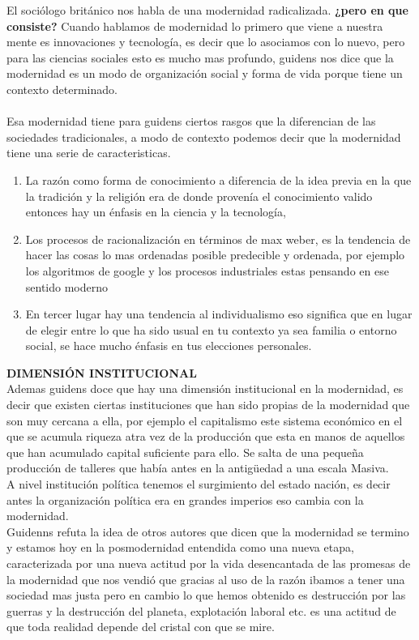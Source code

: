 \documentclass[12pt]{book}
\begin{document}
\newpage 
El sociólogo británico nos habla de una modernidad radicalizada. 
\textbf{¿pero en que consiste?}
Cuando hablamos de modernidad lo primero que viene a nuestra mente es innovaciones y tecnología, es decir que lo asociamos con lo nuevo, pero para las ciencias sociales esto es mucho mas profundo, guidens nos dice que la modernidad es un modo de organización social y forma de vida porque tiene un contexto determinado.
\\
\\
Esa modernidad tiene para guidens ciertos rasgos que la diferencian de las sociedades tradicionales, a modo de contexto podemos decir que la modernidad tiene una serie de caracteristicas.
\begin{enumerate}
\item La razón como forma de conocimiento a diferencia de la idea previa en la que la tradición y la religión era de donde provenía el conocimiento valido entonces hay un énfasis en la ciencia y la tecnología, 
\item Los procesos de racionalización en términos de max weber, es la tendencia de hacer las cosas lo mas ordenadas posible predecible y ordenada, por ejemplo los algoritmos de google y los procesos industriales estas pensando en ese sentido moderno
\item En tercer lugar hay una tendencia al individualismo eso significa que en lugar de elegir entre lo que ha sido usual en tu contexto ya sea familia o entorno social, se hace mucho énfasis en tus elecciones personales.

\end{enumerate}
\textbf{DIMENSIÓN INSTITUCIONAL}
\\
Ademas guidens doce que hay una dimensión institucional en la modernidad, es decir que existen ciertas instituciones que han sido propias de la modernidad que son muy cercana a ella, por ejemplo el capitalismo este sistema económico en el que se acumula riqueza atra vez de la producción que esta en manos de aquellos que han acumulado capital suficiente para ello.
Se salta de una pequeña producción de talleres que había antes en la antigüedad a una escala Masiva.
\\
A nivel institución política tenemos el surgimiento del estado nación, es decir antes la organización política era en grandes imperios eso cambia con la modernidad.
\\
Guidenns refuta la idea de otros autores que dicen que la modernidad se termino y estamos hoy en la posmodernidad entendida como una nueva etapa, caracterizada por una nueva actitud por la vida desencantada de las promesas de la modernidad que nos vendió que gracias al uso de la razón ibamos a tener una sociedad mas justa pero en cambio lo que hemos obtenido es destrucción por las guerras y la destrucción del planeta, explotación laboral etc. es una actitud de que toda realidad depende del cristal con que se mire.
\end{document}
